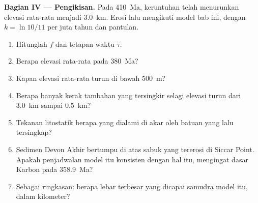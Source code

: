 \begin{problem}
\noindent\textbf{Bagian IV --- Pengikisan.} Pada \qty{410}{Ma}, keruntuhan telah menurunkan elevasi
rata-rata menjadi \qty{3.0}{km}. Erosi lalu mengikuti model bab ini, dengan $k = \ln
10/11$ per juta tahun dan pantulan.
\begin{enumerate}[resume]
\item Hitunglah $f$ dan tetapan waktu $\tau$.
\item Berapa elevasi rata-rata pada \qty{380}{Ma}?
\item Kapan elevasi rata-rata turun di bawah \qty{500}{m}?
\item Berapa banyak kerak tambahan yang tersingkir selagi elevasi turun dari \qty{3.0}{km} sampai \qty{0.5}{km}?
\item Tekanan litostatik berapa yang dialami di akar oleh batuan yang lalu tersingkap?
\item Sedimen Devon Akhir bertumpu di atas sabuk yang tererosi di Siccar Point. Apakah penjadwalan model itu
konsisten dengan hal itu, mengingat dasar Karbon pada \qty{358.9}{Ma}?
\item Sebagai ringkasan: berapa lebar terbesar yang dicapai samudra model itu, dalam kilometer?
\end{enumerate}
\end{problem}
